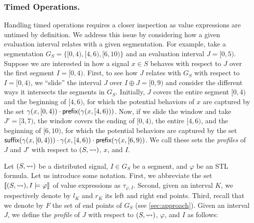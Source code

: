 \subsubsection{Timed Operations.}
Handling timed operations requires a closer inspection as value expressions are untimed by definition.
We address this issue by considering how a given evaluation interval relates with a given segmentation.
For example, take a segmentation $G_S = \{ [0,4), [4,6), [6,10) \}$ and an evaluation interval $J = [0,5)$.
Suppose we are interested in how a signal $x \in S$ behaves with respect to $J$ over the first segment $I = [0,4)$.
First, to see how $J$ relates with $G_S$ with respect to $I =[0,4)$, we  ``slide'' the interval $J$ over $I \oplus J = [0,9)$ and consider the different ways it intersects the segments in $G_S$.
Initially, $J$ covers the entire segment $[0,4)$ and the beginning of $[4,6)$, for which the potential behaviors of $x$ are captured by the set $\gamma(x, [0,4)) \cdot \textsf{prefix}(\gamma(x, [4,6)))$.
Now, if we slide the window and take $J' = [3,7)$, the window covers the ending of $[0,4)$, the entire $[4,6)$, and the beginning of $[6,10)$, for which the potential behaviors are captured by the set $\textsf{suffix}(\gamma(x, [0,4))) \cdot \gamma(x, [4,6)) \cdot \textsf{prefix}(\gamma(x, [6,9))$.
We call these sets the \emph{profiles} of $J$ and $J'$ with respect to $(S,{\rightsquigarrow})$, $x$, and $I$.

Let $(S,{\rightsquigarrow})$ be a distributed signal, $I \in G_S$ be a segment, and $\varphi$ be an STL formula.
Let us introduce some notation.
First, we abbreviate the set $\llbracket (S,{\rightsquigarrow}), I \models \varphi \rrbracket$ of value expressions as $\tau_{\varphi,I}$.
Second, given an interval $K$, we respectively denote by $l_K$ and $r_K$ its left and right end points.
Third, recall that we denote by $F$ the set of end points of $G_S$ (see \cref{sec:approach}).
Given an interval $J$, we define the \emph{profile} of $J$ with respect to $(S,{\rightsquigarrow})$, $\varphi$, and 
$I$ as follows:

